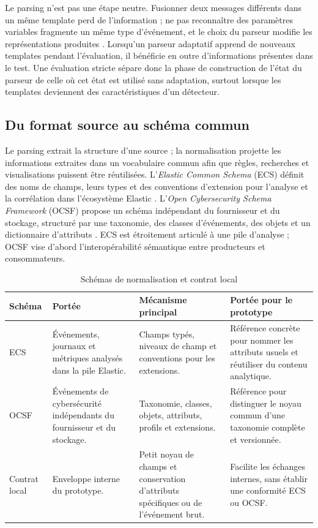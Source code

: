 Le parsing n'est pas une étape neutre. Fusionner deux messages différents dans un même template perd de l'information ; ne pas reconnaître des paramètres variables fragmente un même type d'événement, et le choix du parseur modifie les représentations produites \cite{zhu2019logparser}. Lorsqu'un parseur adaptatif apprend de nouveaux templates pendant l'évaluation, il bénéficie en outre d'informations présentes dans le test. Une évaluation stricte sépare donc la phase de construction de l'état du parseur de celle où cet état est utilisé sans adaptation, surtout lorsque les templates deviennent des caractéristiques d'un détecteur.

\subsection{Du format source au schéma commun}

Le parsing extrait la structure d'une source ; la normalisation projette les informations extraites dans un vocabulaire commun afin que règles, recherches et visualisations puissent être réutilisées. L'\textit{Elastic Common Schema} (ECS) définit des noms de champs, leurs types et des conventions d'extension pour l'analyse et la corrélation dans l'écosystème Elastic \cite{elastic2026ecs}. L'\textit{Open Cybersecurity Schema Framework} (OCSF) propose un schéma indépendant du fournisseur et du stockage, structuré par une taxonomie, des classes d'événements, des objets et un dictionnaire d'attributs \cite{ocsf2026schema}. ECS est étroitement articulé à une pile d'analyse ; OCSF vise d'abord l'interopérabilité sémantique entre producteurs et consommateurs.

\begin{table}[H]
\centering
\caption{Schémas de normalisation et contrat local}
\label{tab:schemas-normalisation}
\small
\begin{tabularx}{\textwidth}{p{2.3cm}p{3.2cm}p{3.5cm}X}
\toprule
\textbf{Schéma} & \textbf{Portée} & \textbf{Mécanisme principal} &
\textbf{Portée pour le prototype} \\
\midrule
ECS \cite{elastic2026ecs} & Événements, journaux et métriques analysés dans la pile Elastic. &
Champs typés, niveaux de champ et conventions pour les extensions. &
Référence concrète pour nommer les attributs usuels et réutiliser du contenu analytique. \\
OCSF \cite{ocsf2026schema} & Événements de cybersécurité indépendants du fournisseur et du stockage. &
Taxonomie, classes, objets, attributs, profils et extensions. &
Référence pour distinguer le noyau commun d'une taxonomie complète et versionnée. \\
Contrat local & Enveloppe interne du prototype. &
Petit noyau de champs et conservation d'attributs spécifiques ou de l'événement brut. &
Facilite les échanges internes, sans établir une conformité ECS ou OCSF. \\
\bottomrule
\end{tabularx}
\end{table}

